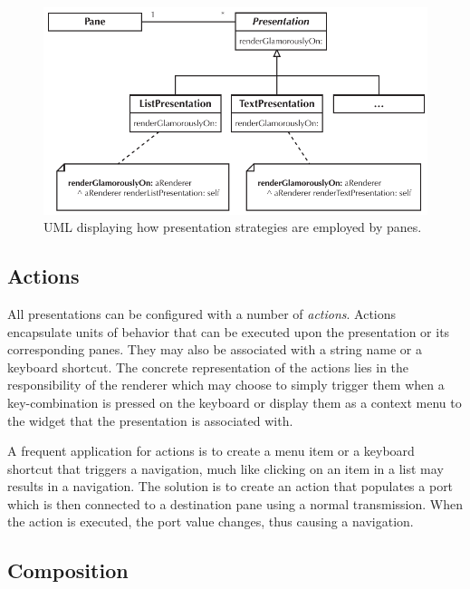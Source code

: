 \documentclass[a4paper,10pt,twoside]{book}
\begin{document}
\begin{figure}[htbp]
\centerline{\includegraphics[width=\linewidth]{uml_strategy.pdf}}
\caption{UML displaying how presentation strategies are employed by panes.}
\label{fig:uml-strategy}
\end{figure}


\subsection{Actions}
\label{sec:impl/actions}

All presentations can be configured with a number of
\emph{actions}. Actions encapsulate units of behavior that can be
executed upon the presentation or its corresponding panes. They may
also be associated with a string name or a keyboard shortcut. The
concrete representation of the actions lies in the responsibility of
the renderer which may choose to simply trigger them when a
key-combination is pressed on the keyboard or display them as a
context menu to the widget that the presentation is associated with.

A frequent application for actions is to create a menu item or a
keyboard shortcut that triggers a navigation, much like clicking on an
item in a list may results in a navigation. The solution is to create
an action that populates a port which is then connected to a
destination pane using a normal transmission. When the action is
executed, the port value changes, thus causing a navigation.


\subsection{Composition}
\label{sec:impl/composition}
\end{document}
